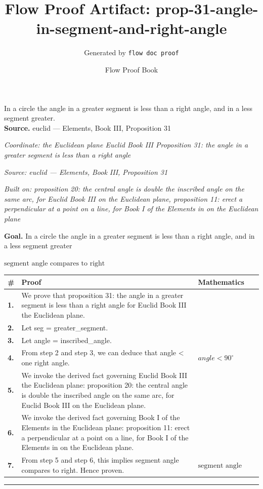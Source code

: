 \documentclass[11pt]{article}
\title{Flow Proof Artifact: prop-31-angle-in-segment-and-right-angle}
\author{Generated by \texttt{flow doc proof}}
\date{Flow Proof Book}
\theoremstyle{definition}
\begin{document}
\maketitle
In a circle the angle in a greater segment is less than a right angle, and in a less segment greater.\\[0.5em]
\textbf{Source.} euclid — Elements, Book III, Proposition 31\\[0.5em]
\bigskip
{}\par
\smallskip\noindent\textit{Coordinate: the Euclidean plane \cdot Euclid Book III \cdot Proposition 31: the angle in a greater segment is less than a right angle}\par
\smallskip\noindent\textit{Source: euclid — Elements, Book III, Proposition 31}\par
\smallskip\noindent\textit{Built on: proposition 20: the central angle is double the inscribed angle on the same arc, for Euclid Book III on the Euclidean plane, proposition 11: erect a perpendicular at a point on a line, for Book I of the Elements in on the Euclidean plane}\par
\medskip
\noindent\textbf{Goal.} In a circle the angle in a greater segment is less than a right angle, and in a less segment greater\par
\noindent$\displaystyle \text{segment angle compares to right}$\par
\medskip
\noindent
\begin{tabular}{@{} >{\raggedright\arraybackslash}p{} >{\raggedright\arraybackslash}p{} >{\raggedleft\arraybackslash}p{} @{}}
\textbf{\#} & \textbf{Proof} & \textbf{Mathematics} \\
\midrule
\textbf{1.} & We prove that proposition 31: the angle in a greater segment is less than a right angle for Euclid Book III the Euclidean plane. & \\[0.45em]
\textbf{2.} & Let seg = greater\_segment. & \\[0.45em]
\textbf{3.} & Let angle = inscribed\_angle. & \\[0.45em]
\textbf{4.} & From step 2 and step 3, we can deduce that angle < one right angle. & $\displaystyle angle < 90^\circ$ \\[0.45em]
\textbf{5.} & We invoke the derived fact governing Euclid Book III the Euclidean plane: proposition 20: the central angle is double the inscribed angle on the same arc, for Euclid Book III on the Euclidean plane. & \\[0.45em]
\textbf{6.} & We invoke the derived fact governing Book I of the Elements in the Euclidean plane: proposition 11: erect a perpendicular at a point on a line, for Book I of the Elements in on the Euclidean plane. & \\[0.45em]
\textbf{7.} & From step 5 and step 6, this implies segment angle compares to right. Hence proven. & $\displaystyle \text{segment angle compares to right}$ \\[0.45em]
\bottomrule
\end{tabular}
\label{thm:Geometry-Euclid Book III-proposition_31_the_angle_in_a_greater_segment_is_less_than_a_right_angle}
\par\medskip\hrule
\end{document}
